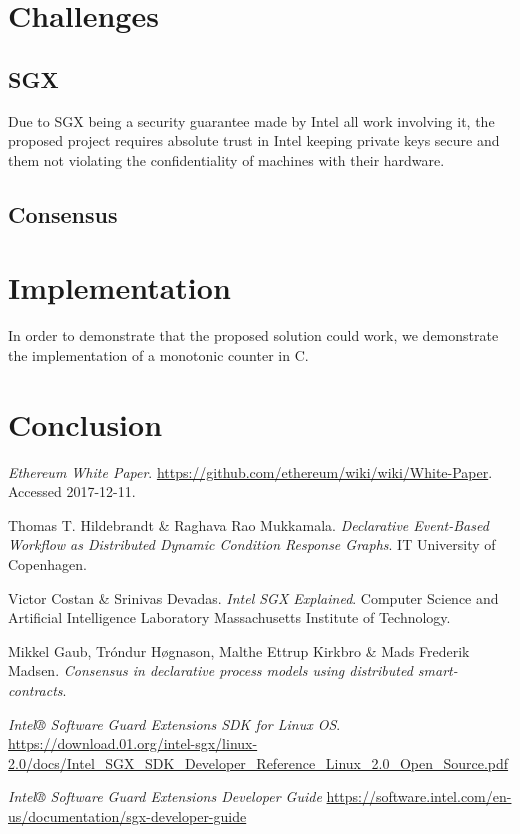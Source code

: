 \documentclass{article}
\newcommand\cpp{C\nolinebreak[4]\hspace{-.05em}\raisebox{.4ex}{\relsize{-3}{\textbf{++}}}}
\begin{document}
	\section{Challenges}

		\subsection{SGX}

		Due to SGX being a security guarantee made by Intel all work involving it, the proposed project requires absolute trust in Intel keeping private keys secure and them not violating the confidentiality of machines with their hardware.

		\subsection{Consensus}	

	\section{Implementation}

	In order to demonstrate that the proposed solution could work, we demonstrate the implementation of a monotonic counter in \cpp.

	\section{Conclusion}

	\begin{thebibliography}{9}

		\textit{Ethereum White Paper}.
		\url{https://github.com/ethereum/wiki/wiki/White-Paper}.
		Accessed 2017-12-11.

		Thomas T. Hildebrandt \& Raghava Rao Mukkamala.
		\textit{Declarative Event-Based Workflow as Distributed Dynamic Condition Response Graphs}.
		IT University of Copenhagen.

		Victor Costan \& Srinivas Devadas.
		\textit{Intel SGX Explained}.
		Computer Science and Artificial Intelligence Laboratory Massachusetts Institute of Technology.

		Mikkel Gaub, Tróndur Høgnason, Malthe Ettrup Kirkbro \& Mads Frederik Madsen.
		\textit{Consensus in declarative process models using distributed smart-contracts}.

		\textit{Intel® Software Guard Extensions SDK for Linux OS}.
		\url{https://download.01.org/intel-sgx/linux-2.0/docs/Intel_SGX_SDK_Developer_Reference_Linux_2.0_Open_Source.pdf}

		\textit{Intel® Software Guard Extensions Developer Guide}
		\url{https://software.intel.com/en-us/documentation/sgx-developer-guide}

	\end{thebibliography}
\end{document}
